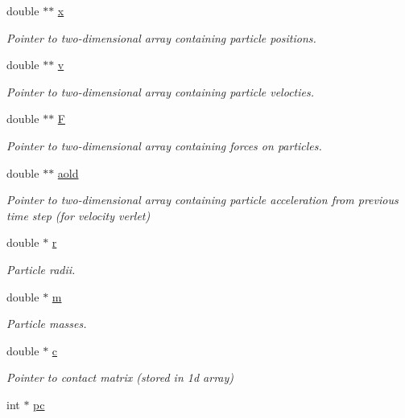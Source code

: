 \begin{DoxyCompactItemize}
double $\ast$$\ast$ \mbox{\hyperlink{classpacking_a3b56d5b429817628d1cd764f4a62827d}{x}}
\begin{DoxyCompactList}\small\item\em Pointer to two-\/dimensional array containing particle positions. \end{DoxyCompactList}\item 
double $\ast$$\ast$ \mbox{\hyperlink{classpacking_a25a8813f1efa77beae413fe335bec3a7}{v}}
\begin{DoxyCompactList}\small\item\em Pointer to two-\/dimensional array containing particle velocties. \end{DoxyCompactList}\item 
double $\ast$$\ast$ \mbox{\hyperlink{classpacking_a39113604e4ffe9563e79e8289e6eed61}{F}}
\begin{DoxyCompactList}\small\item\em Pointer to two-\/dimensional array containing forces on particles. \end{DoxyCompactList}\item 
double $\ast$$\ast$ \mbox{\hyperlink{classpacking_a16ab3555506f30e4848ca52ae1136444}{aold}}
\begin{DoxyCompactList}\small\item\em Pointer to two-\/dimensional array containing particle acceleration from previous time step (for velocity verlet) \end{DoxyCompactList}\item 
double $\ast$ \mbox{\hyperlink{classpacking_a3e301d8084ada7f0258b80639fa83c88}{r}}
\begin{DoxyCompactList}\small\item\em Particle radii. \end{DoxyCompactList}\item 
double $\ast$ \mbox{\hyperlink{classpacking_ab06bef3feef42f5c48c39fa1ae297e23}{m}}
\begin{DoxyCompactList}\small\item\em Particle masses. \end{DoxyCompactList}\item 
double $\ast$ \mbox{\hyperlink{classpacking_a01db0c365f0f66bbc2de30fed7e1881a}{c}}
\begin{DoxyCompactList}\small\item\em Pointer to contact matrix (stored in 1d array) \end{DoxyCompactList}\item 
int $\ast$ \mbox{\hyperlink{classpacking_abbc23675b258dfad02a53e578c1e4589}{pc}}

\end{DoxyCompactItemize}
